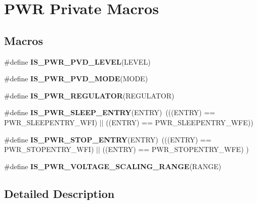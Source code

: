 \hypertarget{group___p_w_r___private___macros}{\section{P\-W\-R Private Macros}
\label{group___p_w_r___private___macros}
}
\subsection*{Macros}
\begin{DoxyCompactItemize}
\item 
\#define {\bfseries I\-S\-\_\-\-P\-W\-R\-\_\-\-P\-V\-D\-\_\-\-L\-E\-V\-E\-L}(L\-E\-V\-E\-L)
\item 
\#define {\bfseries I\-S\-\_\-\-P\-W\-R\-\_\-\-P\-V\-D\-\_\-\-M\-O\-D\-E}(M\-O\-D\-E)
\item 
\#define {\bfseries I\-S\-\_\-\-P\-W\-R\-\_\-\-R\-E\-G\-U\-L\-A\-T\-O\-R}(R\-E\-G\-U\-L\-A\-T\-O\-R)
\item 
\hypertarget{group___p_w_r___private___macros_ga9b36a9c213a77d36340788b2e7e277ff}{\#define {\bfseries I\-S\-\_\-\-P\-W\-R\-\_\-\-S\-L\-E\-E\-P\-\_\-\-E\-N\-T\-R\-Y}(E\-N\-T\-R\-Y)~(((E\-N\-T\-R\-Y) == P\-W\-R\-\_\-\-S\-L\-E\-E\-P\-E\-N\-T\-R\-Y\-\_\-\-W\-F\-I) $\vert$$\vert$ ((E\-N\-T\-R\-Y) == P\-W\-R\-\_\-\-S\-L\-E\-E\-P\-E\-N\-T\-R\-Y\-\_\-\-W\-F\-E))}\label{group___p_w_r___private___macros_ga9b36a9c213a77d36340788b2e7e277ff}

\item 
\hypertarget{group___p_w_r___private___macros_ga4a94eb1f400dec6e486fbc229cbea8a0}{\#define {\bfseries I\-S\-\_\-\-P\-W\-R\-\_\-\-S\-T\-O\-P\-\_\-\-E\-N\-T\-R\-Y}(E\-N\-T\-R\-Y)~(((E\-N\-T\-R\-Y) == P\-W\-R\-\_\-\-S\-T\-O\-P\-E\-N\-T\-R\-Y\-\_\-\-W\-F\-I) $\vert$$\vert$ ((E\-N\-T\-R\-Y) == P\-W\-R\-\_\-\-S\-T\-O\-P\-E\-N\-T\-R\-Y\-\_\-\-W\-F\-E) )}\label{group___p_w_r___private___macros_ga4a94eb1f400dec6e486fbc229cbea8a0}

\item 
\#define {\bfseries I\-S\-\_\-\-P\-W\-R\-\_\-\-V\-O\-L\-T\-A\-G\-E\-\_\-\-S\-C\-A\-L\-I\-N\-G\-\_\-\-R\-A\-N\-G\-E}(R\-A\-N\-G\-E)
\end{DoxyCompactItemize}


\subsection{Detailed Description}


